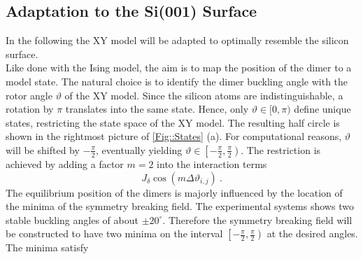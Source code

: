 	\subsection{Adaptation to the Si(001) Surface}\label{Sec::XY-to-Silicon}	
	In the following the XY model will be adapted to optimally resemble the silicon surface. \\ 	%
	
	Like done with the Ising model, the aim is to map the position of the dimer to a model state. The natural choice is to identify the dimer buckling angle with the rotor angle $\vartheta$ of the XY model. Since the silicon atoms are indistinguishable, a rotation by $\pi$ translates into the same state. Hence, only $\vartheta \in [0, \pi)$ define unique states, restricting the state space of the XY model. The resulting half circle is shown in the rightmost picture of \autoref{Fig::States} (a). For computational reasons, $\vartheta $ will be shifted by $-\tfrac{\pi}{2}$, eventually yielding $\vartheta \in \left[-\tfrac{\pi}{2}, \tfrac{\pi}{2}\right)$. The restriction is achieved by adding a factor $m=2$ into the interaction terms 
	\begin{equation} \label{Eq::m-introduction}
		J_\delta \cos \left(m \Delta \vartheta_{i, j}\right)~.
	\end{equation}
	The equilibrium position of the dimers is majorly influenced by the location of the minima of the symmetry breaking field. The experimental systems shows two stable buckling angles of about $\pm 20^\circ$. Therefore the symmetry breaking field will be constructed to have two minima on the interval $\left[-\tfrac{\pi}{2}, \tfrac{\pi}{2}\right)$ at the desired angles. The minima satisfy
